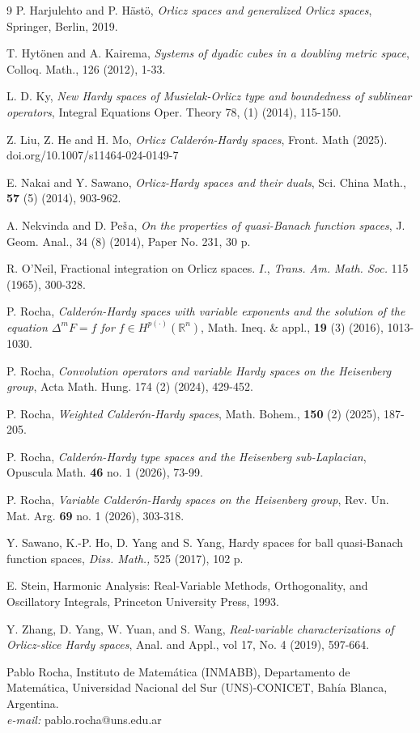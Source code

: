 \documentclass[oneside,10pt]{article}
\begin{document}
\begin{thebibliography}{9}
 P. Harjulehto and P. H\"ast\"o, \textit{Orlicz spaces and generalized Orlicz spaces}, Springer, Berlin, 2019.

 T. Hyt\"onen and A. Kairema, \textit{Systems of dyadic cubes in a doubling metric space}, Colloq. Math., 126 (2012), 1-33.

 L. D. Ky, \textit{New Hardy spaces of Musielak-Orlicz type and boundedness of sublinear operators}, Integral Equations Oper. Theory 78, (1) (2014), 115-150.

 Z. Liu, Z. He and H. Mo, \textit{Orlicz Calder\'on-Hardy spaces}, Front. Math (2025). doi.org/10.1007/s11464-024-0149-7

 E. Nakai and Y. Sawano, \textit{Orlicz-Hardy spaces and their duals}, Sci. China Math., {\bf 57} (5) (2014), 903-962.

 A. Nekvinda and D. Pe$\Check{\text{s}}$a, \textit{On the properties of quasi-Banach function spaces}, J. Geom. Anal., 
34 (8) (2014), Paper No. 231, 30 p.

 R. O'Neil, Fractional integration on Orlicz spaces. $I$., \textit{Trans. Am. Math. Soc.} 115 (1965), 300-328.

 P. Rocha, \textit{Calder\'on-Hardy spaces with variable exponents and the solution of the equation $\Delta^{m}F=f$ for
$f \in H^{p(\cdot)}(\mathbb{R}^{n})$}, Math. Ineq. \& appl., {\bf 19} (3) (2016), 1013-1030.

 P. Rocha, \textit{Convolution operators and variable Hardy spaces on the Heisenberg group}, Acta Math. Hung. 174 (2) 
(2024), 429-452.

 P. Rocha, \textit{Weighted Calder\'on-Hardy spaces}, Math. Bohem., {\bf 150} (2) (2025), 187-205.

 P. Rocha, \textit{Calder\'on-Hardy type spaces and the Heisenberg sub-Laplacian}, Opuscula Math. {\bf 46} no. 1 (2026), 73-99.

 P. Rocha, \textit{Variable Calder\'on-Hardy spaces on the Heisenberg group}, Rev. Un. Mat. Arg. {\bf 69}
no. 1 (2026), 303-318.

 Y. Sawano, K.-P. Ho, D. Yang and S. Yang, Hardy spaces for ball quasi-Banach function spaces, \textit{Diss. Math.,} 525 (2017), 102 p. 

 E. Stein, Harmonic Analysis: Real-Variable Methods, Orthogonality, and Oscillatory Integrals, Princeton University Press, 1993.

 Y. Zhang, D. Yang, W. Yuan, and S. Wang, \textit{Real-variable characterizations of Orlicz-slice Hardy spaces}, 
Anal. and Appl., vol 17, No. 4 (2019), 597-664.

\end{thebibliography}

Pablo Rocha, Instituto de Matem\'atica (INMABB), Departamento de Matem\'atica, Universidad Nacional del Sur (UNS)-CONICET, Bah\'ia Blanca, Argentina. \\
{\it e-mail:} pablo.rocha@uns.edu.ar
\end{document}
